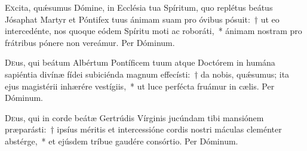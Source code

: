 \documentclass[vesperale_romanum]{subfiles}
\begin{document}
\vespsequentiscomm

\myrule


\duplex

\oratio

\lettrine{E}{x}cita, quǽsumus Dómine, in Ecclésia tua Spíritum, quo replétus beátus Jósaphat Martyr et Póntifex tuus ánimam suam pro óvibus pósuit:~† ut eo intercedénte, nos quoque eódem Spíritu moti ac roboráti,~* ánimam nostram pro frátribus pónere non vereámur. Per Dóminum.


\capitdeseq

\myrule


\duplex



\oratio

\lettrine{D}{e}us, qui beátum Albértum Pontíficem tuum atque Do\-ctórem in humána sapiéntia divínæ fídei subiciénda magnum effecísti:~† da nobis, quǽsumus; ita ejus magistérii inhærére vestígiis,~* ut luce perfécta fruámur in cælis. Per Dóminum.

\capitdeseq

\myrule


\duplex

\oratio

\lettrine{D}{e}us, qui in corde beátæ Gertrúdis Vírginis jucúndam tibi mansiónem præparásti:~† ipsíus méritis et intercessióne cordis nostri máculas cleménter abstérge,~* et ejúsdem tríbue gaudére consórtio. Per Dóminum.

\end{document}

